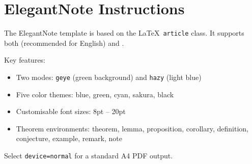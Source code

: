 \section{ElegantNote Instructions}

The ElegantNote template is based on the \LaTeX\ \texttt{article} class. It supports both
 (recommended for English) and .

Key features:
\begin{itemize}
  \item Two modes: \texttt{geye} (green background) and \texttt{hazy} (light blue)
  \item Five color themes: \textcolor{eblue}{blue}, \textcolor{egreen}{green},
        \textcolor{ecyan}{cyan}, \textcolor{sakura}{sakura}, black
  \item Customisable font sizes: 8pt -- 20pt
  \item Theorem environments: theorem, lemma, proposition, corollary, definition,
        conjecture, example, remark, note
\end{itemize}

\begin{note}
  Select \lstinline{device=normal} for a standard A4 PDF output.
\end{note}
